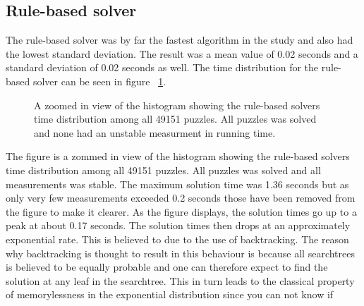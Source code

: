 \documentclass[a4paper,11pt]{kth-mag}
\begin{document}
\subsection{Rule-based solver}
The rule-based solver was by far the fastest algorithm in the study and also had the lowest standard deviation. 
The result was a mean value of 0.02 seconds and a standard deviation of 0.02 seconds as well. 
The time distribution for the rule-based solver can be seen in 
figure ~\ref{fig:rule-basedDistribution}. 
\begin{figure}[here] 
\noindent{}
\caption{A zoomed in view of the histogram showing the rule-based solvers time distribution among all 49151 puzzles. All puzzles was solved and none had an unstable measurment in running time.}
\label{fig:rule-basedDistribution}
\end{figure}

The figure is a zommed in view of the histogram showing the rule-based solvers time distribution among all 49151 puzzles. 
All puzzles was solved and all measurements was stable. 
The maximum solution time was 1.36 seconds but as only very few measurements exceeded 0.2 seconds those have been removed from the figure to make it clearer.
As the figure displays, the solution times go up to a peak at about 0.17 seconds.
The solution times then drops at an approximately exponential rate.
This is believed to due to the use of backtracking.
The reason why backtracking is thought to result in this behaviour is because all searchtrees is believed to be equally probable and one can therefore expect to find the solution at any leaf in the searchtree.
This in turn leads to the classical property of memorylessness in the exponential distribution since you can not know if
\end{document}
